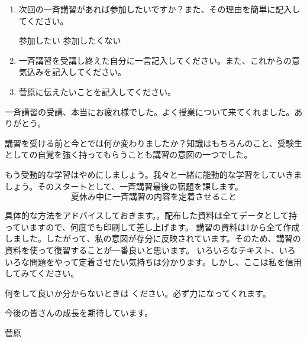 \begin{enumerate}
    \item 次回の一斉講習があれば参加したいですか？また、その理由を簡単に記入してください。
      \begin{center}
        参加したい \qquad\qquad\qquad\qquad 参加したくない\\[1.5em]
      \sheetline[0.95\linewidth][2em]
      \end{center}

    \item 一斉講習を受講し終えた自分に一言記入してください。また、これからの意気込みを記入してください。
      \begin{center}
      \sheetline[0.95\linewidth][4em]
      \end{center}

    \item 菅原に伝えたいことを記入してください。
      \begin{center}
      \sheetline[0.95\linewidth][8em]
      \end{center}
    \end{enumerate}
    \vspace{1.5em}

    \begingroup
    \setlength{\parindent}{1zw}
    \setlength{\parskip}{0pt}

    \indent 一斉講習の受講、本当にお疲れ様でした。よく授業について来てくれました。ありがとう。

    講習を受ける前と今とでは何か変わりましたか？知識はもちろんのこと、受験生としての自覚を強く持ってもらうことも講習の意図の一つでした。

    もう受動的な学習はやめにしましょう。我々と一緒に能動的な学習をしていきましょう。そのスタートとして、一斉講習最後の宿題を課します。
    \[\textbf{夏休み中に一斉講習の内容を定着させること}\]

    具体的な方法をアドバイスしておきます。。配布した資料は全てデータとして持っていますので、何度でも印刷して差し上げます。
    講習の資料は1から全て作成しました。したがって、私の意図が存分に反映されています。そのため、講習の資料を使って復習することが一番良いと思います。
    いろいろなテキスト、いろいろな問題をやって定着させたい気持ちは分かります。しかし、ここは私を信用してみてください。

    何をして良いか分からないときは  ください。必ず力になってくれます。

    今後の皆さんの成長を期待しています。

    \begin{flushright}
    菅原
    \end{flushright}

    \endgroup
